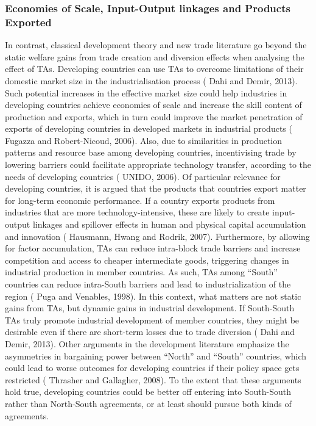 \documentclass[12pt]{article}%
\begin{document}
\subsubsection{Economies of Scale, Input{-}Output linkages and Products Exported}%
\label{ssubsec:EconomiesofScale,Input{-}OutputlinkagesandProductsExported}%

%
In contrast, classical development theory and new trade literature go
beyond the static welfare gains from trade creation and diversion
effects when analysing the effect of TAs. Developing countries can use
TAs to overcome limitations of their domestic market size in the
industrialisation process (\cite{dahi_preferential_2013} Dahi and Demir, 2013). Such potential
increases in the effective market size could help industries in
developing countries achieve economies of scale and increase the skill
content of production and exports, which in turn could improve the
market penetration of exports of developing countries in developed
markets in industrial products (\cite{fugazza_can_2006} Fugazza and Robert-Nicoud, 2006). Also,
due to similarities in production patterns and resource base among
developing countries, incentivising trade by lowering barriers could
facilitate appropriate technology transfer, according to the needs of
developing countries (\cite{unido_industrial_2006} UNIDO, 2006). Of particular relevance for
developing countries, it is argued that the products that countries
export matter for long-term economic performance. If a country exports
products from industries that are more technology-intensive, these are
likely to create input-output linkages and spillover effects in human
and physical capital accumulation and innovation (\cite{hausmann_what_2007} Hausmann, Hwang and
Rodrik, 2007). Furthermore, by allowing for factor accumulation, TAs can
reduce intra-block trade barriers and increase competition and access to
cheaper intermediate goods, triggering changes in industrial production
in member countries. As such, TAs among ``South'' countries can reduce
intra-South barriers and lead to industrialization of the region (\cite{puga_trading_1998} Puga
and Venables, 1998). In this context, what matters are not static gains
from TAs, but dynamic gains in industrial development. If South-South
TAs truly promote industrial development of member countries, they might
be desirable even if there are short-term losses due to trade diversion
(\cite{dahi_preferential_2013} Dahi and Demir, 2013). Other arguments in the development literature
emphasize the asymmetries in bargaining power between ``North'' and
``South'' countries, which could lead to worse outcomes for developing
countries if their policy space gets restricted (\cite{thrasher_21st_2008} Thrasher and Gallagher,
2008). To the extent that these arguments hold true, developing
countries could be better off entering into South-South rather than
North-South agreements, or at least should pursue both kinds of
agreements.
\end{document}
